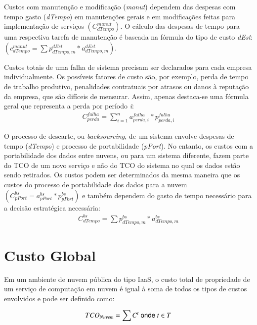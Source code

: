 \documentclass[tese,capa]{texufpel}
\begin{document}
Custos com manutenção e modificação (\emph{manut}) dependem das despesas com tempo gasto (\emph{dTempo}) em manutenções gerais e em modificações feitas para implementação de serviços $\left(C^{manut}_{dTempo}\right)$. O cálculo das despesas de tempo para uma respectiva tarefa de manutenção é baseada na fórmula do tipo de custo \emph{dEst}: $\left(c^{manut}_{dTempo} = \sum p^{dEst}_{dTempo,m} * a^{dEst}_{dTempo,m}\right)$.

Custos totais de uma falha de sistema precisam ser declarados para cada empresa individualmente. Os possíveis fatores de custo são, por exemplo, perda de tempo de trabalho produtivo, penalidades contratuais por atrasos ou danos à reputação da empresa, que são difíceis de mensurar. Assim, apenas destaca-se uma fórmula geral que representa a perda por período \emph{i}:
\begin{eqnarray*}
C^{falha}_{perda} = \sum\limits^{n}_{i=1} a^{falha}_{perda,i} * p^{falha}_{perda,i}
\end{eqnarray*}

O processo de descarte, ou \emph{backsourcing}, de um sistema envolve despesas de tempo (\emph{dTempo}) e processo de portabilidade (\emph{pPort}). No entanto, os custos com a portabilidade dos dados entre nuvens, ou para um sistema diferente, fazem parte do TCO de um novo serviço e não do TCO do sistema no qual os dados estão sendo retirados. Os custos podem ser determinados da mesma maneira que os custos do processo de portabilidade dos dados para a nuvem $\left(C^{bs}_{pPort} = a^{bs}_{pPort} * p^{bs}_{pPort}\right)$ e também dependem do gasto de tempo necessário para a decisão estratégica necessária:
\begin{eqnarray*}
C^{bs}_{dTempo} = \sum p^{bs}_{dTempo,m} * a^{bs}_{dTempo,m}
\end{eqnarray*}

\section{Custo Global}\label{sec:custo_global}

Em um ambiente de nuvem pública do tipo IaaS, o custo total de propriedade de um serviço de computação em nuvem é igual à soma de todos os tipos de custos envolvidos e pode ser definido como:

\begin{equation}
  \centering
  \begin{aligned}
    TCO_{Nuvem} = \sum C^t ~\textsf{onde}~ t \in T
  \end{aligned}
  \label{eq:tco}
\end{equation}
\end{document}
